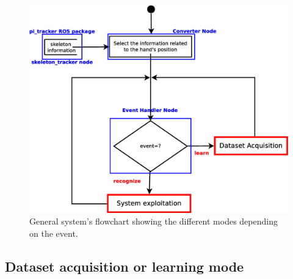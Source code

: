 \begin{figure}[H]
	\begin{center}
\includegraphics[width=0.8\linewidth]{img/diagrams/flowchart1.eps}
	\caption[General system's flowchart]{General system's flowchart showing the different modes depending on the event.}
	\label{flowchart1}
	\end{center}
\end{figure}




\subsection{Dataset acquisition or learning mode}\mbox{}
\\


